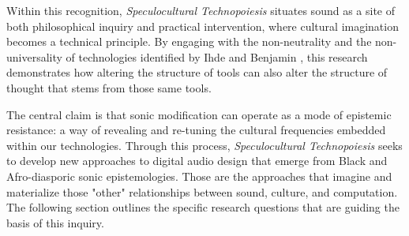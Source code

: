 Within this recognition, \textit{Speculocultural Technopoiesis} situates sound as a site of both philosophical inquiry and practical intervention, where cultural imagination becomes a technical principle. By engaging with the non-neutrality and the non-universality of technologies identified by Ihde and Benjamin \parencite{Ihde_1990, Benjamin_2019a}, this research demonstrates how altering the structure of tools can also alter the structure of thought that stems from those same tools.

The central claim is that sonic modification can operate as a mode of epistemic resistance: a way of revealing and re-tuning the cultural frequencies embedded within our technologies. Through this process, \textit{Speculocultural Technopoiesis} seeks to develop new approaches to digital audio design that emerge from Black and Afro-diasporic sonic epistemologies. Those are the approaches that imagine and materialize those "other" relationships between sound, culture, and computation. The following section outlines the specific research questions that are guiding the basis of this inquiry.